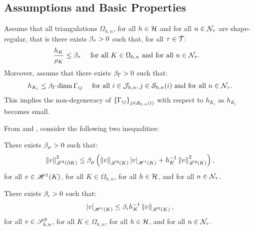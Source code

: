 \newpage
\subsection{Assumptions and Basic Properties}

Assume that all triangulations $\Omega_{h, n}$, for all $h \in \mathcal{H}$ and for all $n \in \mathcal{N}_{\tau}$ are shape-regular, that is there exists $\beta_{\tau} > 0$ such that, for all $\tau \in \mathcal{T}$:
\begin{align}
    \frac{h_K}{\rho_K} &\leq \beta_{\tau} &\text{ for all } K \in \Omega_{h, n} \text{ and for all } n \in \mathcal{N}_{\tau}. \label{equation:ass_h}
&\end{align}
Moreover, assume that there exists $\beta_{\Gamma} > 0$ such that:
\begin{align}
    h_{K_i} &\leq \beta_{\Gamma} \operatorname*{diam} \Gamma_{ij} &\text{ for all } i \in \mathcal{J}_{h, n}, j \in \mathcal{S}_{h, n}(i) \text{ and for all } n \in \mathcal{N}_{\tau}. \label{equation:ass_hd}
\end{align}
This implies the non-degeneracy of $\left\{ \Gamma_{ij} \right\}_{j \in \mathcal{S}_{h, n}(i)}$ with respect to $h_{K_i}$ as $h_{K_i}$ becomes small.

From \cite{Dolejší2002} and \cite{Ciarlet1978}, consider the following two inequalities:

\begin{lemma}
    There exists $\beta_{\mu} > 0$ such that:
    \begin{align}
        \left\lVert v \right\rVert_{\mathscr{L}^{2}(\partial K)}^2 \leq \beta_{\mu} \left( \left\lVert v \right\rVert_{\mathscr{L}^{2}(K)} \left\lvert v \right\rvert_{\mathscr{H}^{1}(K)} + h_K^{-1} \left\lVert v \right\rVert_{\mathscr{L}^{2}(K)}^2 \right),
    \end{align}
    for all $v \in \mathscr{H}^{1}(K)$, for all $K \in \Omega_{h, n}$, for all $h \in \mathcal{H}$, and for all $n \in \mathcal{N}_{\tau}$.
\end{lemma}

\begin{lemma}
    There exists $\beta_{\iota} > 0$ such that:
    \begin{align}
        \left\lvert v \right\rvert_{\mathscr{H}^{1}(K)} \leq \beta_{\iota} h_K^{-1} \left\lVert v \right\rVert_{\mathscr{L}^{2}(K)},
    \end{align}
    for all $v \in \mathscr{S}^p_{h, n}$, for all $K \in \Omega_{h, n}$, for all $h \in \mathcal{H}$, and for all $n \in \mathcal{N}_{\tau}$.
\end{lemma}

